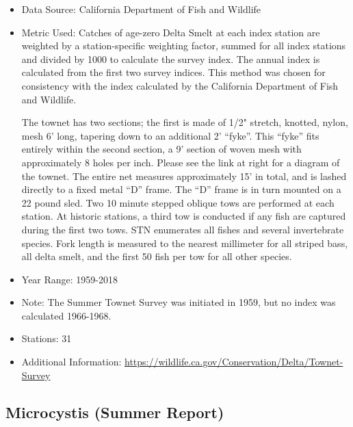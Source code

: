 \documentclass[
]{book}
\begin{document}
\begin{itemize}
\item
  Data Source: California Department of Fish and Wildlife
\item
  Metric Used: Catches of age-zero Delta Smelt at each index station are weighted by a station-specific weighting factor, summed for all index stations and divided by 1000 to calculate the survey index. The annual index is calculated from the first two survey indices. This method was chosen for consistency with the index calculated by the California Department of Fish and Wildlife.

  The townet has two sections; the first is made of 1/2" stretch, knotted, nylon, mesh 6' long, tapering down to an additional 2' ``fyke''. This ``fyke'' fits entirely within the second section, a 9' section of woven mesh with approximately 8 holes per inch. Please see the link at right for a diagram of the townet. The entire net measures approximately 15' in total, and is lashed directly to a fixed metal ``D'' frame. The ``D'' frame is in turn mounted on a 22 pound sled. Two 10 minute stepped oblique tows are performed at each station. At historic stations, a third tow is conducted if any fish are captured during the first two tows. STN enumerates all fishes and several invertebrate species. Fork length is measured to the nearest millimeter for all striped bass, all delta smelt, and the first 50 fish per tow for all other species.
\item
  Year Range: 1959-2018
\item
  Note: The Summer Townet Survey was initiated in 1959, but no index was calculated 1966-1968.
\item
  Stations: 31
\item
  Additional Information: \url{https://wildlife.ca.gov/Conservation/Delta/Townet-Survey}
\end{itemize}

\hypertarget{microcystis-summer-report}{%
\subsection{Microcystis (Summer Report)}\label{microcystis-summer-report}}
\end{document}
